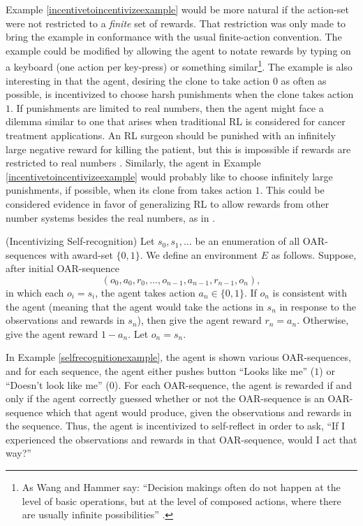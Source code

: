 \documentclass[runningheads]{llncs}
\begin{document}
Example \ref{incentivetoincentivizeexample} would be more natural if the action-set were
not restricted to a \emph{finite} set of rewards.
That restriction was only made to bring the example in conformance with the usual
finite-action convention.
The example could be modified by allowing
the agent to notate rewards by typing on a keyboard (one action per key-press) or something
similar\footnote{As Wang and Hammer say: ``Decision makings often do not happen
at the level of basic operations, but at the level of composed actions, where
there are usually infinite possibilities'' \cite{wang2015assumptions}.}.
The example is also interesting in that the agent, desiring the clone to take action $0$
as often as possible, is incentivized to choose harsh punishments when the clone takes
action $1$. If punishments are limited to real numbers, then the agent might face a dilemma
similar to one that arises when traditional RL is considered for cancer treatment applications.
An RL surgeon should be punished with an infinitely large negative reward for killing
the patient, but this is impossible if rewards are restricted to real numbers
\cite{wirth2017survey} \cite{zhao2009reinforcement}. Similarly, the agent in Example
\ref{incentivetoincentivizeexample} would probably like to choose infinitely large
punishments, if possible, when its clone from takes action $1$. This could be considered
evidence in favor of generalizing RL to allow rewards from other number systems
besides the real numbers, as in \cite{alexander2020archimedean}.

\begin{example}
\label{selfrecognitionexample}
    (Incentivizing Self-recognition)
    Let $s_0,s_1,\ldots$ be an enumeration of all OAR-sequences with award-set
    $\{0,1\}$. We define an environment $E$ as follows.
    Suppose, after initial OAR-sequence
    \[(o_0,a_0,r_0,\ldots,o_{n-1},a_{n-1},r_{n-1},o_n),\]
    in which each $o_i=s_i$,
    the agent takes action $a_n\in\{0,1\}$. If $o_n$ is consistent with the agent
    (meaning that the agent would take the actions in $s_n$ in response to the observations
    and rewards in $s_n$), then give the agent reward $r_n=a_n$.
    Otherwise, give the agent reward $1-a_n$. Let $o_n=s_n$.
\end{example}

In Example \ref{selfrecognitionexample}, the agent is shown various OAR-sequences, and for
each sequence, the agent either pushes button ``Looks like me'' ($1$)
or ``Doesn't look like me'' ($0$). For each OAR-sequence, the agent is rewarded if and
only if the agent correctly guessed whether or not the OAR-sequence is an OAR-sequence
which that agent would produce, given the observations and rewards in the sequence.
Thus, the agent is incentivized to self-reflect in order to ask, ``If I experienced the
observations and rewards in that OAR-sequence, would I act that way?''
\end{document}
